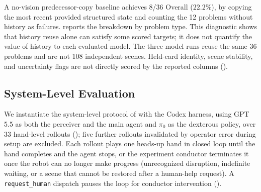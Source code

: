 A no-vision predecessor-copy baseline achieves 8/36 Overall ($22.2\%$), by copying the most recent provided structured state and counting the 12 problems without history as failures.  reports the breakdown by problem type. This diagnostic shows that history reuse alone can satisfy some scored targets; it does not quantify the value of history to each evaluated model. The three model runs reuse the same 36 problems and are not 108 independent scenes. Held-card identity, scene stability, and uncertainty flags are not directly scored by the reported columns ().

\subsection{System-Level Evaluation}
\label{subsec:system_eval_results}

We instantiate the system-level protocol of  with the Codex harness, using GPT 5.5 as both the perceiver and the main agent and $\pi_0$ as the dexterous policy, over 33 hand-level rollouts (); five further rollouts invalidated by operator error during setup are excluded. Each rollout plays one heads-up hand in closed loop until the hand completes and the agent stops, or the experiment conductor terminates it once the robot can no longer make progress (unrecognized disruption, indefinite waiting, or a scene that cannot be restored after a human-help request). A \texttt{request\_human} dispatch pauses the loop for conductor intervention ().

